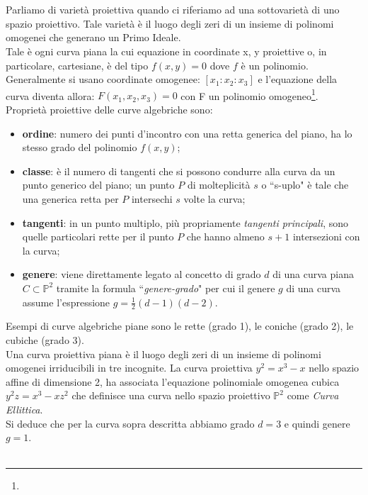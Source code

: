 \documentclass[a4paper,12pt]{tesiinfo}
\newcommand\ddfrac[2]{\frac{\displaystyle #1}{\displaystyle #2}}
\renewcommand{\footnotesize}{\fontsize{9pt}{11pt}\selectfont}
\begin{document}
%
%
%
\\\\
Parliamo di variet\`a proiettiva quando ci riferiamo ad una sottovariet\`a di uno spazio proiettivo. Tale variet\`a \`e il luogo degli zeri di un insieme di polinomi omogenei che generano un Primo Ideale.
\\
Tale \`e ogni curva piana la cui equazione in coordinate x, y proiettive o, in particolare, cartesiane, \`e del tipo $f (x, y)=0$ dove $f$ \`e un polinomio. Generalmente si usano coordinate omogenee: $[x_1 : x_2 : x_3 ]$ e l'equazione della curva diventa allora:  $F(x_1 , x_2 , x_3 )=0$ con F un polinomio omogeneo\footnote{\footnotesize{Tutte le variabili del polinomio hanno il medesimo grado}}.
Propriet\`a proiettive delle curve algebriche sono: 
\begin{itemize}
  \item \textbf{ordine}: numero dei punti d'incontro con una retta generica del piano, ha lo stesso grado del polinomio $f (x, y)$; 
  \item \textbf{classe}: \`e il numero di tangenti che si possono condurre alla curva da un punto generico del piano; un punto $P$ di molteplicit\`a $s$ o ``s-uplo" \`e tale che una generica retta per $P$ intersechi $s$ volte la curva;
  \item \textbf{tangenti}: in un punto multiplo, pi\`u propriamente \textit{tangenti principali}, sono quelle particolari rette per il punto $P$ che hanno almeno $s + 1$ intersezioni con la curva; 
  \item \textbf{genere}: viene direttamente legato al concetto di grado $d$ di una curva piana $C \subset \mathbb{P}^2$ tramite la formula ``\textit{genere-grado}" per cui il genere $g$ di una curva assume
  l'espressione $g = \ddfrac{1}{2} (d-1)(d-2)$.
\end{itemize} 
Esempi di curve algebriche piane sono le rette (grado 1), le coniche (grado 2), le cubiche (grado 3).
\\
Una curva proiettiva piana \`e il luogo degli zeri di un insieme di polinomi omogenei irriducibili in tre incognite. La curva proiettiva $y^2 = x^3 -x$ nello spazio affine di dimensione 2, ha associata l'equazione polinomiale omogenea cubica $y^2z = x^3 - xz^2$ che definisce una curva nello spazio proiettivo $\mathbb{P}^2$ come \textit{Curva Ellittica}. 
\\
Si deduce che per la curva sopra descritta abbiamo grado $d = 3$ e quindi genere $g = 1$.
\\\\
\end{document}
